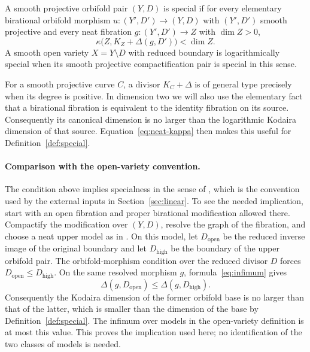 \begin{definition}\label{def:special}
A smooth projective orbifold pair $(Y,D)$ is special if for every
elementary birational orbifold morphism
$u:(Y',D')\to(Y,D)$ with $(Y',D')$ smooth projective and every neat fibration
$g:(Y',D')\to Z$ with $\dim Z>0$,
\[
 \kappa\bigl(Z,K_Z+\Delta(g,D')\bigr)<\dim Z.
\]
A smooth open variety $X=Y\setminus D$ with reduced boundary is
logarithmically special when its smooth projective compactification pair
is special in this sense.
\end{definition}

For a smooth projective curve $C$, a divisor $K_C+\Delta$ is of general
type precisely when its degree is positive. In dimension two we will
also use the elementary fact that a birational fibration is equivalent
to the identity fibration on its source. Consequently its canonical
dimension is no larger than the logarithmic Kodaira dimension of that
source. Equation~\eqref{eq:neat-kappa} then makes this useful for
Definition~\ref{def:special}.

\paragraph{Comparison with the open-variety convention.}
The condition above implies specialness in the sense of
\cite[Definition 2.1]{CDY2025}, which is the convention used by the
external inputs in Section~\ref{sec:linear}. To see the needed
implication, start with an open fibration and proper birational
modification allowed there. Compactify the modification over $(Y,D)$,
resolve the graph of the fibration, and choose a neat upper model as
in \cite[Proposition 2.8]{CDHP2026}. On this model, let $D_{\mathrm{open}}$
be the reduced inverse image of the original boundary and let
$D_{\mathrm{high}}$ be the boundary of the upper orbifold pair.
The orbifold-morphism condition over the reduced divisor $D$ forces
$D_{\mathrm{open}}\leq D_{\mathrm{high}}$. On the same resolved
morphism $g$, formula~\eqref{eq:infimum} gives
\[
 \Delta(g,D_{\mathrm{open}})\leq\Delta(g,D_{\mathrm{high}}).
\]
Consequently the Kodaira dimension of the former orbifold base is no
larger than that of the latter, which is smaller than the dimension
of the base by Definition~\ref{def:special}. The infimum over models
in the open-variety definition is at most this value. This proves
the implication used here; no identification of the two classes of
models is needed.
